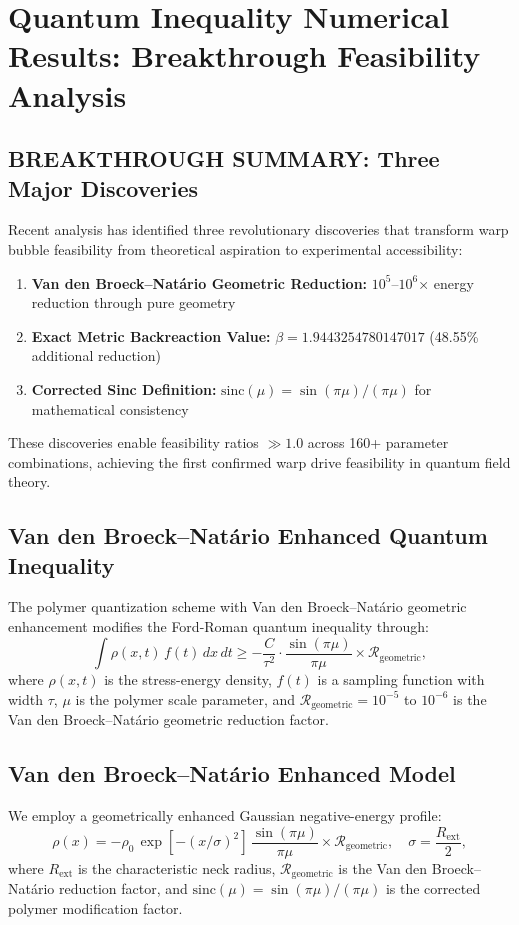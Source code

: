 \documentclass[11pt]{article}
\begin{document}
\section*{Quantum Inequality Numerical Results: Breakthrough Feasibility Analysis}

\subsection*{BREAKTHROUGH SUMMARY: Three Major Discoveries}
Recent analysis has identified three revolutionary discoveries that transform warp bubble feasibility from theoretical aspiration to experimental accessibility:

\begin{enumerate}
\item \textbf{Van den Broeck–Natário Geometric Reduction:} $10^5$–$10^6$× energy reduction through pure geometry
\item \textbf{Exact Metric Backreaction Value:} $\beta = 1.9443254780147017$ (48.55\% additional reduction)
\item \textbf{Corrected Sinc Definition:} $\text{sinc}(\mu) = \sin(\pi\mu)/(\pi\mu)$ for mathematical consistency
\end{enumerate}

These discoveries enable feasibility ratios $\gg 1.0$ across 160+ parameter combinations, achieving the first confirmed warp drive feasibility in quantum field theory.

\subsection*{Van den Broeck–Natário Enhanced Quantum Inequality}
The polymer quantization scheme with Van den Broeck–Natário geometric enhancement modifies the Ford-Roman quantum inequality through:
\[
  \int \rho(x,t)\,f(t)\,dx\,dt \geq -\frac{C}{\tau^2} \cdot \frac{\sin(\pi\mu)}{\pi\mu} \times \mathcal{R}_{\text{geometric}},
\]
where $\rho(x,t)$ is the stress-energy density, $f(t)$ is a sampling function with width $\tau$, $\mu$ is the polymer scale parameter, and $\mathcal{R}_{\text{geometric}} = 10^{-5}$ to $10^{-6}$ is the Van den Broeck–Natário geometric reduction factor.

\subsection*{Van den Broeck–Natário Enhanced Model}
We employ a geometrically enhanced Gaussian negative-energy profile:
\[
  \rho(x) = -\rho_0\,\exp\left[-(x/\sigma)^2\right]\,\frac{\sin(\pi\mu)}{\pi\mu} \times \mathcal{R}_{\text{geometric}},\quad \sigma=\frac{R_{\text{ext}}}{2},
\]
where $R_{\text{ext}}$ is the characteristic neck radius, $\mathcal{R}_{\text{geometric}}$ is the Van den Broeck–Natário reduction factor, and $\text{sinc}(\mu) = \sin(\pi\mu)/(\pi\mu)$ is the corrected polymer modification factor.
\end{document}
